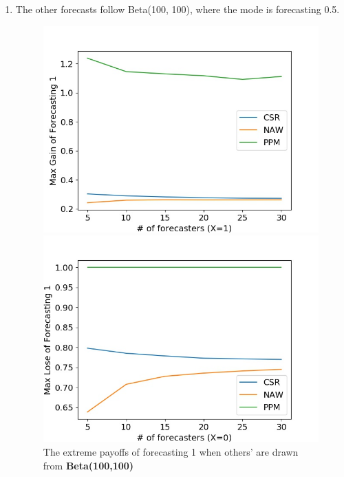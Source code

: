 \documentclass[english,10pt]{article}
\begin{document}
\begin{enumerate}
	\item The other forecasts follow Beta(100, 100), where the mode is forecasting 0.5.
	\begin{figure}[H]
        	\centering
        	\begin{minipage}{0.48\textwidth}
        	\includegraphics[width = \textwidth]{(Beta(100_100)F_UnifW)Max_gain_of_forecasting_1.jpg}
        	\end{minipage}
        	\begin{minipage}{0.48\textwidth}
        	\includegraphics[width = \textwidth]{(Beta(100_100)F_UnifW)Max_lose_of_forecasting_1.jpg}
        	\end{minipage}
        	\caption{The  extreme payoffs of forecasting 1 when others' are drawn from \textbf{Beta(100,100)}}
        	\end{figure}
	

\end{enumerate}
\end{document}
